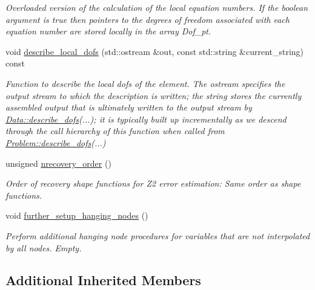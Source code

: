 \begin{DoxyCompactItemize}
\begin{DoxyCompactList}\small\item\em Overloaded version of the calculation of the local equation numbers. If the boolean argument is true then pointers to the degrees of freedom associated with each equation number are stored locally in the array Dof\+\_\+pt. \end{DoxyCompactList}\item 
void \hyperlink{classoomph_1_1RefineableQSpectralPoissonElement_abcb898df228c936e96d47f0b3e790078}{describe\+\_\+local\+\_\+dofs} (std\+::ostream \&out, const std\+::string \&current\+\_\+string) const
\begin{DoxyCompactList}\small\item\em Function to describe the local dofs of the element. The ostream specifies the output stream to which the description is written; the string stores the currently assembled output that is ultimately written to the output stream by \hyperlink{classoomph_1_1Data_a2dae16e2dcff9a40029f834c83364df5}{Data\+::describe\+\_\+dofs}(...); it is typically built up incrementally as we descend through the call hierarchy of this function when called from \hyperlink{classoomph_1_1Problem_abc103804eb319ae0b3d43870cc3e1eaf}{Problem\+::describe\+\_\+dofs}(...) \end{DoxyCompactList}\item 
unsigned \hyperlink{classoomph_1_1RefineableQSpectralPoissonElement_a3fec9c4202b17052d7425c6d89d5b745}{nrecovery\+\_\+order} ()
\begin{DoxyCompactList}\small\item\em Order of recovery shape functions for Z2 error estimation\+: Same order as shape functions. \end{DoxyCompactList}\item 
void \hyperlink{classoomph_1_1RefineableQSpectralPoissonElement_a6adfcc5e7ed0bbc70cc3604010088eb9}{further\+\_\+setup\+\_\+hanging\+\_\+nodes} ()
\begin{DoxyCompactList}\small\item\em Perform additional hanging node procedures for variables that are not interpolated by all nodes. Empty. \end{DoxyCompactList}\end{DoxyCompactItemize}
\subsection*{Additional Inherited Members}


